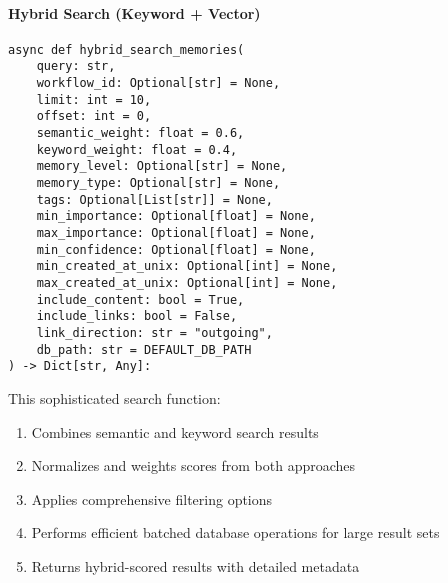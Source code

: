 \documentclass[12pt,a4paper]{article}
\begin{document}
\paragraph{Hybrid Search (Keyword + Vector)}
\begin{pageablecode}
\begin{verbatim}
async def hybrid_search_memories(
    query: str,
    workflow_id: Optional[str] = None,
    limit: int = 10,
    offset: int = 0,
    semantic_weight: float = 0.6,
    keyword_weight: float = 0.4,
    memory_level: Optional[str] = None,
    memory_type: Optional[str] = None,
    tags: Optional[List[str]] = None,
    min_importance: Optional[float] = None,
    max_importance: Optional[float] = None,
    min_confidence: Optional[float] = None,
    min_created_at_unix: Optional[int] = None,
    max_created_at_unix: Optional[int] = None,
    include_content: bool = True,
    include_links: bool = False,
    link_direction: str = "outgoing",
    db_path: str = DEFAULT_DB_PATH
) -> Dict[str, Any]:
\end{verbatim}
\end{pageablecode}
This sophisticated search function:
\begin{enumerate}[label=\arabic*.]
    \item Combines semantic and keyword search results
    \item Normalizes and weights scores from both approaches
    \item Applies comprehensive filtering options
    \item Performs efficient batched database operations for large result sets
    \item Returns hybrid-scored results with detailed metadata
\end{enumerate}
\end{document}
